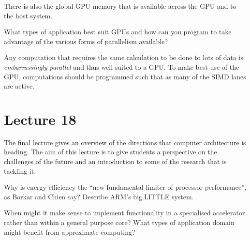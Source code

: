 \documentclass{supervision}
\begin{document}
\begin{questions}
\begin{solution}
    There is also the global GPU memory that is available across the GPU and to the host system.
    \end{solution}

    \question
    What types of application best suit GPUs and how can you program to take advantage of the various forms of parallelism available?
    \begin{solution}
    Any computation that requires the same calculation to be done to lots of data is \textit{embarrassingly parallel} and thus well suited to a GPU. To make best use of the GPU, computations should be programmed such that as many of the SIMD lanes are active.
    \end{solution}

\end{questions}

\section*{Lecture 18}

The final lecture gives an overview of the directions that computer architecture is heading. The aim of this lecture is to give students a perspective on the challenges of the future and an introduction to some of the research that is tackling it.

\begin{questions}
    \question
    Why is energy efficiency the “new fundamental limiter of processor performance”, as Borkar and Chien say?
    \question
    Describe ARM’s big.LITTLE system.
    \question
    When might it make sense to implement functionality in a specialised accelerator rather than within a general purpose core?
    \question
    What types of application domain might benefit from approximate computing?

\end{questions}
\end{document}

